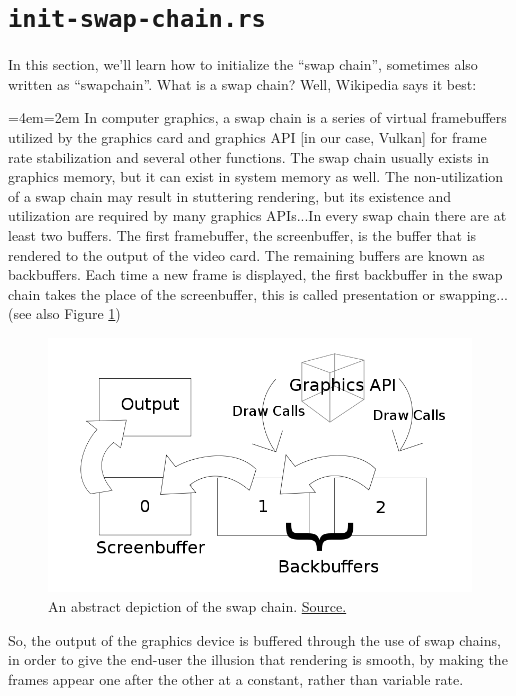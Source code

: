 \documentclass[12pt,letterpaper]{article}
\newcommand{\inquotes}[1]{``#1''}	%
\newenvironment{indenttext}{%
	\par%
	\medskip
	\leftskip=4em\rightskip=2em%
	\noindent\ignorespaces}{%
	\par\medskip}
\begin{document}
\section{\texttt{init-swap-chain.rs}}
	In this section, we'll learn how to initialize the \inquotes{swap chain}, sometimes also written as \inquotes{swapchain}. What is a swap chain? Well, Wikipedia says it best\autocite{wiki:swap-chain}:
		\begin{indenttext}
			In computer graphics, a swap chain is a series of virtual framebuffers utilized by the graphics card and graphics API [in our case, Vulkan] for frame rate stabilization and several other functions. The swap chain usually exists in graphics memory, but it can exist in system memory as well. The non-utilization of a swap chain may result in stuttering rendering, but its existence and utilization are required by many graphics APIs...In every swap chain there are at least two buffers. The first framebuffer, the screenbuffer, is the buffer that is rendered to the output of the video card. The remaining buffers are known as backbuffers. Each time a new frame is displayed, the first backbuffer in the swap chain takes the place of the screenbuffer, this is called presentation or swapping...(see also Figure \ref{fig:swap-chain-depiction})
		\end{indenttext}
	
		\begin{figure}
			\centering
			\includegraphics[width=0.7\linewidth]{swap-chain-depiction}
			\caption{An abstract depiction of the swap chain. \href{https://en.wikipedia.org/wiki/File:Swap_chain_depiction.svg}{Source.}}
			\label{fig:swap-chain-depiction}
		\end{figure}

	So, the output of the graphics device is buffered through the use of swap chains, in order to give the end-user the illusion that rendering is smooth, by making the frames appear one after the other at a constant, rather than variable rate.
	
\end{document}
